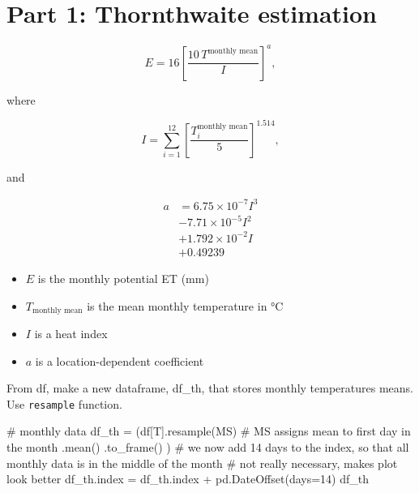 \documentclass[
  letterpaper,
  DIV=11,
  numbers=noendperiod]{scrreprt}
\newenvironment{Shaded}{\begin{snugshade}}{\end{snugshade}}
\newcommand{\CommentTok}[1]{\textcolor[rgb]{0.37,0.37,0.37}{#1}}
\newcommand{\DecValTok}[1]{\textcolor[rgb]{0.68,0.00,0.00}{#1}}
\newcommand{\NormalTok}[1]{\textcolor[rgb]{0.00,0.23,0.31}{#1}}
\newcommand{\OperatorTok}[1]{\textcolor[rgb]{0.37,0.37,0.37}{#1}}
\newcommand{\StringTok}[1]{\textcolor[rgb]{0.13,0.47,0.30}{#1}}
\providecommand{\tightlist}{%
  \setlength{\itemsep}{0pt}\setlength{\parskip}{0pt}}\usepackage{longtable,booktabs,array}
\begin{document}
\hypertarget{part-1-thornthwaite-estimation}{%
\section{Part 1: Thornthwaite
estimation}\label{part-1-thornthwaite-estimation}}

\[
E = 16\left[ \frac{10\,T^\text{monthly mean}}{I} \right]^a,
\]

where

\[
I = \sum_{i=1}^{12} \left[ \frac{T_i^\text{monthly mean}}{5} \right]^{1.514},
\]

and

\[
\begin{align}
a &= 6.75\times 10^{-7}I^3 \\
   &- 7.71\times 10^{-5}I^2 \nonumber\\
   &+ 1.792\times 10^{-2}I \nonumber\\
   &+ 0.49239 \nonumber
\end{align}
\]

\begin{itemize}
\tightlist
\item
  \(E\) is the monthly potential ET (mm)
\item
  \(T_\text{monthly mean}\) is the mean monthly temperature in °C
\item
  \(I\) is a heat index
\item
  \(a\) is a location-dependent coefficient
\end{itemize}

From df, make a new dataframe, df\_th, that stores monthly temperatures
means. Use \texttt{resample} function.

\begin{Shaded}
\begin{Highlighting}[]
\CommentTok{\# monthly data}
\NormalTok{df\_th }\OperatorTok{=}\NormalTok{ (df[}\StringTok{\textquotesingle{}T\textquotesingle{}}\NormalTok{].resample(}\StringTok{\textquotesingle{}MS\textquotesingle{}}\NormalTok{)  }\CommentTok{\# MS assigns mean to first day in the month}
\NormalTok{                .mean()}
\NormalTok{                .to\_frame()}
\NormalTok{        )}
\CommentTok{\# we now add 14 days to the index, so that all monthly data is in the middle of the month}
\CommentTok{\# not really necessary, makes plot look better}
\NormalTok{df\_th.index }\OperatorTok{=}\NormalTok{ df\_th.index }\OperatorTok{+}\NormalTok{ pd.DateOffset(days}\OperatorTok{=}\DecValTok{14}\NormalTok{)}
\NormalTok{df\_th}
\end{Highlighting}
\end{Shaded}
\end{document}
